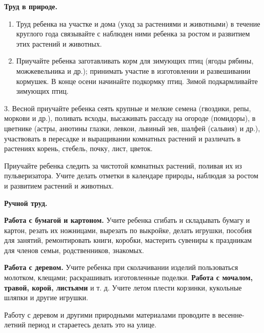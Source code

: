\documentclass{book}
\begin{document}
\textbf{Труд в природе.}


\begin{enumerate}
\def\labelenumi{\arabic{enumi}.}
\item
  
  Труд ребенка на участке и дома (уход за растениями и животными) в
  течение круглого года связывайте с наблюден ними ребенка за ростом и
  развитием этих растений и животных.
  
\item
  
  Приучайте ребенка заготавливать корм для зимующих птиц (ягоды рябины,
  можжевельника и др.); принимать участие в изготовлении и развешивании
  кормушек. В конце осени начинайте подкормку птиц. Зимой подкармливайте
  зимующих птиц.
  
\end{enumerate}


3. Весной приучайте ребенка сеять крупные и мелкие семена (гвоздики,
репы, моркови и др.), поливать всходы, высаживать рассаду на огороде
(помидоры), в цветнике (астры, анютины глазки, левкои, львиный зев,
шалфей (сальвия) и др.), участвовать в пересадке и выращивании комнатных
растений и различать в растениях корень, стебель, почку, лист, цветок.

Приучайте ребенка следить за чистотой комнатных растений, поливая их из
пульверизатора. Учите делать отметки в календаре природы\textbf{,}
наблюдая за ростом и развитием растений и животных.

\textbf{Ручной труд.}

\textbf{Работа с бумагой и картоном.} Учите ребенка сгибать и складывать
бумагу и картон, резать их ножницами, вырезать по выкройке, делать
игрушки, пособия для занятий, ремонтировать книги, коробки, мастерить
сувениры к праздникам для членов семьи, родственников, знакомых.

\textbf{Работа с деревом.} Учите ребенка при сколачивании изделий
пользоваться молотком, клещами; раскрашивать изготовленные поделки.
\textbf{Работа с мочалом, травой, корой, листьями} и т. д. Учите летом
плести корзинки, кукольные шляпки и другие игрушки.

Работу с деревом и другими природными материалами проводите в
весенне-летний период и стараетесь делать это на улице.
\end{document}
